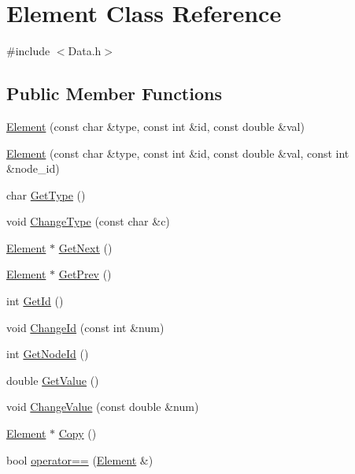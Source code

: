 \hypertarget{class_element}{}\section{Element Class Reference}
\label{class_element}


{\ttfamily \#include $<$Data.\+h$>$}

\subsection*{Public Member Functions}
\begin{DoxyCompactItemize}
\item 
\hyperlink{class_element_a46b133f5dd7f66a6e77628e1c5909bb1}{Element} (const char \&type, const int \&id, const double \&val)
\item 
\hyperlink{class_element_a9c44833eb17cd7dcde61cf62441ddc6f}{Element} (const char \&type, const int \&id, const double \&val, const int \&node\+\_\+id)
\item 
char \hyperlink{class_element_abf168ef6eb9292ad9878de3927382988}{Get\+Type} ()
\item 
void \hyperlink{class_element_ad815916d8823e895a58aae13d6f9bdc1}{Change\+Type} (const char \&c)
\item 
\hyperlink{class_element}{Element} $\ast$ \hyperlink{class_element_aa2e180ec42309fa35851a8e6ea5d7b7d}{Get\+Next} ()
\item 
\hyperlink{class_element}{Element} $\ast$ \hyperlink{class_element_a2697e4bfa4e1a68413fe04acc95418ef}{Get\+Prev} ()
\item 
int \hyperlink{class_element_a1192c24be1306b12c253b24abd03eeb9}{Get\+Id} ()
\item 
void \hyperlink{class_element_ae485f257d8d1bfa17799e89a5c755050}{Change\+Id} (const int \&num)
\item 
int \hyperlink{class_element_a7c6a9ed71c86ae116e289ad4337b3bce}{Get\+Node\+Id} ()
\item 
double \hyperlink{class_element_a0bdfb4632264f577549e3d63a96d873a}{Get\+Value} ()
\item 
void \hyperlink{class_element_a05e7b2e6cd8036ea3ae07cb71df60499}{Change\+Value} (const double \&num)
\item 
\hyperlink{class_element}{Element} $\ast$ \hyperlink{class_element_a5610b61ae29c76de5806068d30366e3c}{Copy} ()
\item 
bool \hyperlink{class_element_a27fd8cbd0279307253208407944edfc9}{operator==} (\hyperlink{class_element}{Element} \&)
\end{DoxyCompactItemize}
